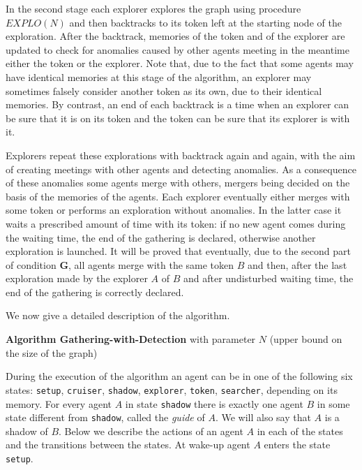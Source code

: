 \documentclass[11pt]{article}
\begin{document}
 In the second stage each explorer explores the graph using procedure $EXPLO(N)$ and then backtracks to its token
 left at the starting node of the exploration. After the backtrack, memories of the token and of the explorer are updated to check for anomalies caused by other agents
 meeting in the meantime either the token or the explorer. Note that, due to the fact that some agents may have identical memories at this stage of the algorithm, 
 an explorer may sometimes falsely consider another token as its own, due to their identical memories. By contrast, an end of each
 backtrack is a time when an explorer can be sure that it is on its token and the token can be sure that its explorer is with it.  
 
 Explorers repeat these explorations with backtrack again and again, with the aim of creating meetings with other agents and detecting anomalies.
 As a consequence of these anomalies some agents merge with others, mergers being decided on the basis of the memories of the agents.
Each explorer eventually either merges with some token or performs an exploration without anomalies. In the latter case it waits a prescribed amount of time with its token: if
no new agent comes during the waiting time, the end of the gathering is declared, otherwise another exploration is launched. It will be proved that eventually, due to the second part of condition {\bf G}, all agents merge with the same
token $B$ and then, after the last exploration made by the explorer $A$ of $B$ and after undisturbed waiting time, the end of the gathering is correctly declared.
 
  
 We now give a detailed description of the algorithm.
 
 \vspace*{0.3cm}
 
 \noindent
 {\bf Algorithm Gathering-with-Detection} with parameter $N$ (upper bound on the size of the graph)
 
  \vspace*{0.2cm}
 
 During the execution of the algorithm an agent can be in one of the following six states: {\tt setup},  {\tt cruiser}, {\tt shadow}, {\tt explorer},  {\tt token}, {\tt searcher},
 depending on its memory.
 For every agent $A$ in state  {\tt shadow} there is exactly one agent $B$ in some state different from  {\tt shadow}, called the {\em guide} of $A$. We will also
 say that $A$ is a shadow of $B$.
 Below we describe the actions of an agent $A$ in each of the states and the transitions between the states. At wake-up agent $A$ enters the state  {\tt setup}.
 
\end{document}
